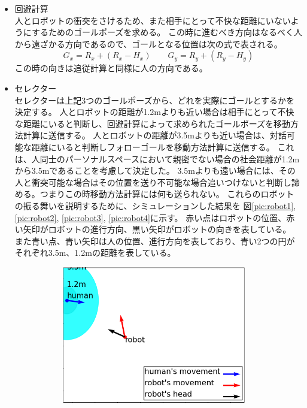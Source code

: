 \documentclass{kuisthesis}
\begin{document}
\begin{itemize}
  \item 回避計算 \\
  人とロボットの衝突をさけるため、また相手にとって不快な距離にいないようにするためのゴールポーズを求める。
  この時に進むべき方向はなるべく人から遠ざかる方向であるので、ゴールとなる位置は次の式で表される。
  \begin{equation}
    G_x = R_x + (R_x - H_x) \qquad G_y = R_y + (R_y - H_y)
  \end{equation}
  この時の向きは追従計算と同様に人の方向である。
  \item セレクター \\
  セレクターは上記3つのゴールポーズから、どれを実際にゴールとするかを決定する。
  人とロボットの距離が1.2mよりも近い場合は相手にとって不快な距離にいると判断し、回避計算によって求められたゴールポーズを移動方法計算に送信する。
  人とロボットの距離が3.5mよりも近い場合は、対話可能な距離にいると判断しフォローゴールを移動方法計算に送信する。
  これは、人同士のパーソナルスペースにおいて親密でない場合の社会距離が1.2mから3.5mであることを考慮して決定した。
  3.5mよりも遠い場合には、その人と衝突可能な場合はその位置を送り不可能な場合追いつけないと判断し諦める。つまりこの時移動方法計算には何も送られない。
  これらのロボットの振る舞いを説明するために、シミュレーションした結果を
  図\ref{pic:robot1}, \ref{pic:robot2}, \ref{pic:robot3}, \ref{pic:robot4}に示す。
  赤い点はロボットの位置、赤い矢印がロボットの進行方向、黒い矢印がロボットの向きを表している。
  また青い点、青い矢印は人の位置、進行方向を表しており、青い2つの円がそれぞれ3.5m、1.2mの距離を表している。
\begin{figure}[H]
  \begin{subfigure}{0.5\textwidth}
    \includegraphics[width=0.95\textwidth]{img/simulation1.png}

\end{subfigure}
\end{figure}
\end{itemize}
\end{document}
